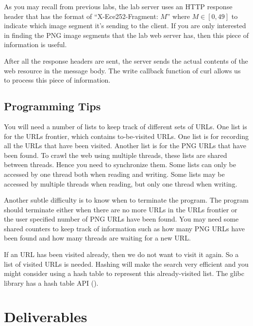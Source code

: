 As you may recall from previous labs, the lab server uses an HTTP response header that has the format of ``X-Ece252-Fragment: $M$'' where $M \in [0, 49]$ to indicate which image segment it's sending to the client. If you are only interested in finding the PNG image segments that the lab web server has, then this piece of information is useful.

After all the response headers are sent, the server sends the actual contents of the web resource in the message body. The write callback function of curl allows us to process this piece of information. 
\subsection{Programming Tips}
You will need a number of lists to keep track of different sets of URLs. One list is for the URLs frontier, which contains to-be-visited URLs. One list is for recording all the URLs that have been visited. Another list is for the PNG URLs that have been found. To crawl the web using multiple threads, these lists are shared between threads. Hence you need to synchronize them. Some lists can only be accessed by one thread both when reading and writing. Some lists may be accessed by multiple threads when reading, but only one thread when writing.

Another subtle difficulty is to know when to terminate the program. The program should terminate either when there are no more URLs in the URLs frontier or the user specified number of PNG URLs have been found. You may need some shared counters to keep track of information such as how many PNG URLs have been found and how many threads are waiting for a new URL.

If an URL has been visited already, then we do not want to visit it again. So a list of visited URLs is needed. Hashing will make the search very efficient and you might consider using a hash table to represent this already-visited list. The glibc library has a hash table API ().

\section{Deliverables}
